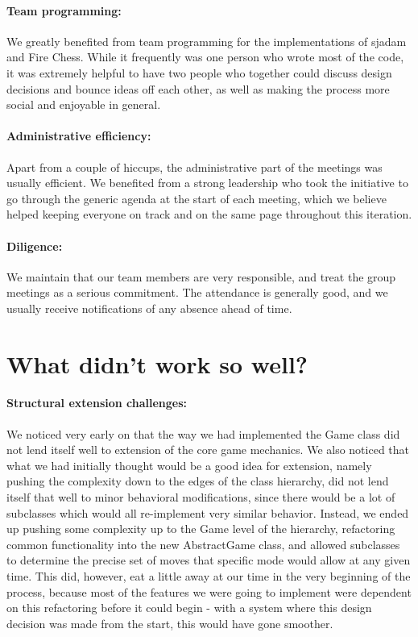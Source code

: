\documentclass{article}
\begin{document}
\paragraph{Team programming:} We greatly benefited from team programming for the implementations of sjadam and Fire Chess. While it frequently was one person who wrote most of the code, it was extremely helpful to have two people who together could discuss design decisions and bounce ideas off each other, as well as making the process more social and enjoyable in general.

\paragraph{Administrative efficiency:} Apart from a couple of hiccups, the administrative part of the meetings was usually efficient. We benefited from a strong leadership who took the initiative to go through the generic agenda at the start of each meeting, which we believe helped keeping everyone on track and on the same page throughout this iteration.

\paragraph{Diligence:} We maintain that our team members are very responsible, and treat the group meetings as a serious commitment. The attendance is generally good, and we usually receive notifications of any absence ahead of time.

\section*{What didn't work so well?}

\paragraph{Structural extension challenges:} We noticed very early on that the way we had implemented the Game class did not lend itself well to extension of the core game mechanics. We also noticed that what we had initially thought would be a good idea for extension, namely pushing the complexity down to the edges of the class hierarchy, did not lend itself that well to minor behavioral modifications, since there would be a lot of subclasses which would all re-implement very similar behavior. Instead, we ended up pushing some complexity up to the Game level of the hierarchy, refactoring common functionality into the new AbstractGame class, and allowed subclasses to determine the precise set of moves that specific mode would allow at any given time. This did, however, eat a little away at our time in the very beginning of the process, because most of the features we were going to implement were dependent on this refactoring before it could begin - with a system where this design decision was made from the start, this would have gone smoother.
\end{document}
